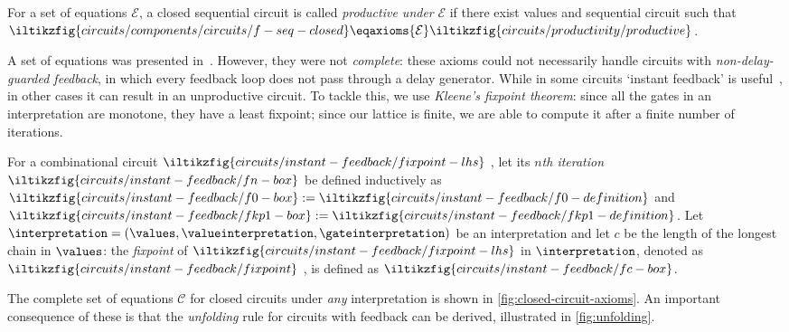 \documentclass[10pt]{article}
\begin{document}
    \begin{definition}[Productivity]
        For a set of equations \(\mathcal{E}\), a closed sequential circuit  is called \emph{productive under} \(\mathcal{E}\) if there exist values  and sequential circuit  such that
        \(
            \iltikzfig{circuits/components/circuits/f-seq-closed} 
            \eqaxioms{\mathcal{E}}
            \iltikzfig{circuits/productivity/productive}
        \).
    \end{definition}

    \noindent
    A set of equations was presented in~\cite{ghica2016categorical}.
    However, they were not \emph{complete}: these axioms could not necessarily handle circuits with \emph{non-delay-guarded feedback}, in which every feedback loop does not pass through a delay generator.
    While in some circuits `instant feedback' is useful~\cite{riedel2004cyclic,mendler2012constructive}, in other cases it can result in an unproductive circuit.
    To tackle this, we use \emph{Kleene's fixpoint theorem}: since all the gates in an interpretation are monotone, they have a least fixpoint; since our lattice is finite, we are able to compute it after a finite number of iterations.

    \begin{definition}
        For a combinational circuit
        \(\iltikzfig{circuits/instant-feedback/fixpoint-lhs}\)
        , let its \emph{\(n\)th iteration} 
        \(\iltikzfig{circuits/instant-feedback/fn-box}\) 
        be defined inductively as
        \(
            \iltikzfig{circuits/instant-feedback/f0-box} 
            := 
            \iltikzfig{circuits/instant-feedback/f0-definition}
        \) 
        and 
        \(
            \iltikzfig{circuits/instant-feedback/fkp1-box} 
            := 
            \iltikzfig{circuits/instant-feedback/fkp1-definition}
        \).
        Let \(\interpretation = (\values,\valueinterpretation,\gateinterpretation)\) be an interpretation and let \(c\) be the length of the longest chain in \(\values\): the \emph{fixpoint} of 
        \(\iltikzfig{circuits/instant-feedback/fixpoint-lhs}\)
        in \(\interpretation\), denoted as 
        \(\iltikzfig{circuits/instant-feedback/fixpoint}\)
        , is defined as \(\iltikzfig{circuits/instant-feedback/fc-box}\).
    \end{definition}
    
    \noindent
    The complete set of equations \(\mathcal{C}\) for closed circuits under \emph{any} interpretation is shown in \cref{fig:closed-circuit-axioms}.
    An important consequence of these is that the \emph{unfolding} rule for circuits with feedback can be derived, illustrated in \cref{fig:unfolding}.
\end{document}
